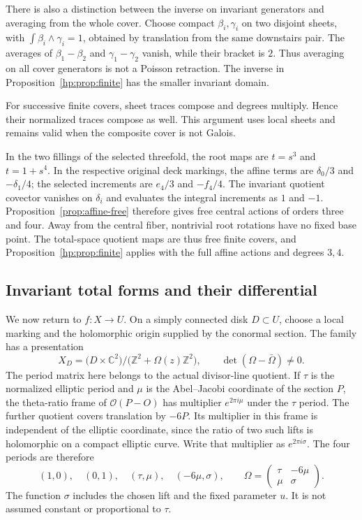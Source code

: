 There is also a distinction between the inverse on invariant
generators and averaging from the whole cover. Choose compact
$\beta_i,\gamma_i$ on two disjoint sheets, with
$\int\beta_i\wedge\gamma_i=1$, obtained by translation from the
same downstairs pair. The averages of
$\beta_1-\beta_2$ and $\gamma_1-\gamma_2$ vanish, while their
bracket is $2$. Thus averaging on all cover generators is not a
Poisson retraction. The inverse in
Proposition~\ref{hp:prop:finite} has the smaller invariant domain.

For successive finite covers, sheet traces compose and degrees
multiply. Hence their normalized traces compose as well. This
argument uses local sheets and remains valid when the composite
cover is not Galois.

In the two fillings of the selected threefold, the root maps are
$t=s^3$ and $t=1+s^4$. In the respective original deck markings,
the affine terms are $\delta_0/3$ and $-\delta_1/4$; the selected
increments are $e_4/3$ and $-f_4/4$. The invariant quotient
covector vanishes on $\delta_i$ and evaluates the integral
increments as $1$ and $-1$. Proposition~\ref{prop:affine-free}
therefore gives free central actions of orders three and four.
Away from the central fiber, nontrivial root rotations have no
fixed base point. The total-space quotient maps are thus free
finite covers, and Proposition~\ref{hp:prop:finite} applies with
the full affine actions and degrees $3,4$.

\subsection{Invariant total forms and their differential}
\label{hp:subsec:invariant}

We now return to $f:X\to U$. On a simply connected disk $D\subset U$,
choose a local marking and the holomorphic origin supplied by the
conormal section. The family has a presentation
\begin{equation}\label{hp:eq:torus}
 X_D=\bigl(D\times\mathbb C^2\bigr)/
             \bigl(\mathbb Z^2+\Omega(z)\mathbb Z^2\bigr),
 \qquad \det(\Omega-\bar\Omega)\ne0.
\end{equation}
The period matrix here belongs to the actual divisor-line quotient.
If $\tau$ is the normalized elliptic period and $\mu$ is the
Abel--Jacobi coordinate of the section $P$, the theta-ratio frame
of $\mathcal O(P-O)$ has multiplier $e^{2\pi i\mu}$ under the
$\tau$ period. The further quotient covers translation by $-6P$.
Its multiplier in this frame is independent of the elliptic
coordinate, since the ratio of two such lifts is holomorphic on a
compact elliptic curve. Write that multiplier as $e^{2\pi i\sigma}$.
The four periods are therefore
\begin{equation}\label{hp:eq:native-periods}
 (1,0),\quad(0,1),\quad(\tau,\mu),\quad(-6\mu,\sigma),
 \qquad
 \Omega=\begin{pmatrix}\tau&-6\mu\\ \mu&\sigma\end{pmatrix}.
\end{equation}
The function $\sigma$ includes the chosen lift and the fixed
parameter $u$. It is not assumed constant or proportional to $\tau$.

